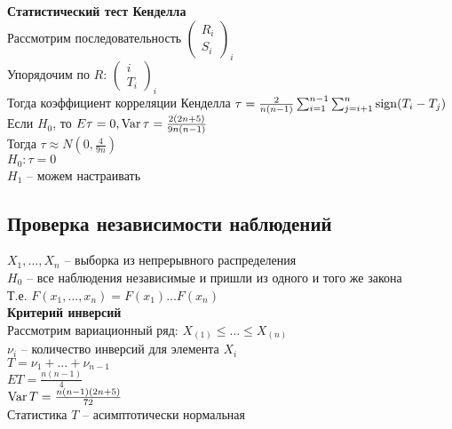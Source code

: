 \documentclass[12pt]{article}
\begin{document}
\textbf{Статистический тест Кенделла}\\
Рассмотрим последовательность $\left(\begin{array}{c}
	R_i\\S_i
\end{array}\right)_i$\\
Упорядочим по $R$: $\left(\begin{array}{c}
	i\\T_i
\end{array}\right)_i$\\
Тогда коэффициент корреляции Кенделла $\tau = \frac{2}{n(n-1)}\sum_{i=1}^{n-1}\sum_{j=i+1}^n \operatorname{sign}(T_i - T_j)$\\
Если $H_0$, то $E\tau = 0, \operatorname{Var} \tau = \frac{2(2n+5)}{9n(n-1)}$\\
Тогда $\tau \approx N(0, \frac{4}{9n})$\\
$H_0: \tau = 0$\\
$H_1$ -- можем настраивать\\
\subsection{Проверка независимости наблюдений}
$X_1, \ldots, X_n$ -- выборка из непрерывного распределения\\
$H_0$ -- все наблюдения независимые и пришли из одного и того же закона\\
Т.е. $F(x_1, \ldots, x_n) = F(x_1)\ldots F(x_n)$\\
\textbf{Критерий инверсий}\\
Рассмотрим вариационный ряд: $X_{(1)} \leq \ldots \leq X_{(n)}$\\
$\nu_i$ -- количество инверсий для элемента $X_i$\\
$T = \nu_1 + \ldots + \nu_{n-1}$\\
$ET = \frac{n(n-1)}{4}$\\
$\operatorname{Var} T = \frac{n(n-1)(2n+5)}{72}$\\
Статистика $T$ -- асимптотически нормальная\\
\end{document}
